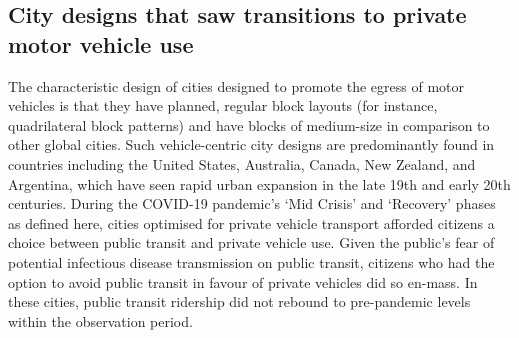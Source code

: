 \documentclass[preprint,10pt]{elsarticle} %
\begin{document}
\subsection*{City designs that saw transitions to private motor vehicle use}

The characteristic design of cities designed to promote the egress of motor vehicles is that they have planned, regular block layouts (for instance, quadrilateral block patterns) and have blocks of medium-size in comparison to other global cities\cite{Thompson2020}. Such vehicle-centric city designs are predominantly found in countries including the United States, Australia, Canada, New Zealand, and Argentina, which have seen rapid urban expansion in the late 19th and early 20th centuries. During the COVID-19 pandemic's `Mid Crisis' and `Recovery' phases as defined here, cities optimised for private vehicle transport afforded citizens a choice between public transit and private vehicle use. Given the public's fear of potential infectious disease transmission on public transit\cite{fernando2023shaping}, citizens who had the option to avoid public transit in favour of private vehicles did so en-mass. In these cities, public transit ridership did not rebound to pre-pandemic levels within the observation period. 
\end{document}
